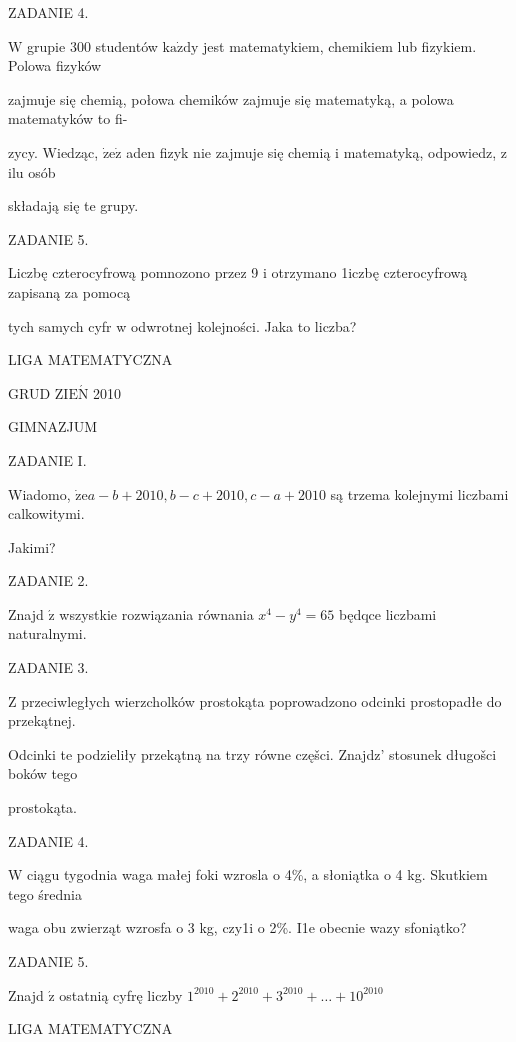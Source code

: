 \documentclass[a4paper,12pt]{article}
\begin{document}
ZADANIE 4.

$\mathrm{W}$ grupie 300 studentów $\mathrm{k}\mathrm{a}\dot{\mathrm{z}}\mathrm{d}\mathrm{y}$ jest matematykiem, chemikiem lub fizykiem. Polowa fizyków

zajmuje się chemią, połowa chemików zajmuje się matematyką, a polowa matematyków to fi-

zycy. Wiedząc, $\dot{\mathrm{z}}\mathrm{e}\dot{\mathrm{z}}$ aden fizyk nie zajmuje się chemią i matematyką, odpowiedz, z ilu osób

składają się te grupy.

ZADANIE 5.

Liczbę czterocyfrową pomnozono przez 9 i otrzymano 1iczbę czterocyfrową zapisaną za pomocą

tych samych cyfr w odwrotnej kolejności. Jaka to liczba?






LIGA MATEMATYCZNA

GRUD Z$\mathrm{I}\mathrm{E}\acute{\mathrm{N}}$ 2010

GIMNAZJUM

ZADANIE I.

Wiadomo, $\dot{\mathrm{z}}\mathrm{e}a-b+2010, b-c+2010, c-a+2010$ są trzema kolejnymi liczbami calkowitymi.

Jakimi?

ZADANIE 2.

Znajd $\acute{\mathrm{z}}$ wszystkie rozwiązania równania $x^{4}-y^{4}=65$ będqce liczbami naturalnymi.

ZADANIE 3.

Z przeciwległych wierzcholków prostokąta poprowadzono odcinki prostopadłe do przekątnej.

Odcinki te podzieliły przekątną na trzy równe częšci. Znajdz' stosunek długošci boków tego

prostokąta.

ZADANIE 4.

W ciągu tygodnia waga małej foki wzrosla o 4\%, a słoniątka o 4 kg. Skutkiem tego średnia

waga obu zwierząt wzrosfa o 3 kg, czy1i o 2\%. I1e obecnie wazy sfoniątko?

ZADANIE 5.

Znajd $\acute{\mathrm{z}}$ ostatnią cyfrę liczby $1^{2010}+2^{2010}+3^{2010}+\ldots+10^{2010}$






LIGA MATEMATYCZNA
\end{document}
